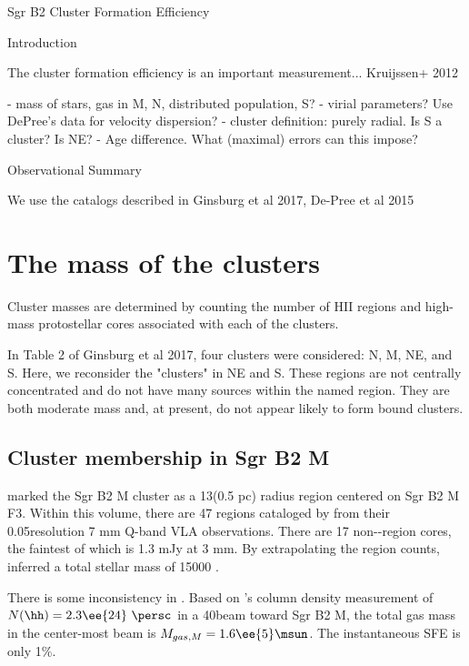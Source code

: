 Sgr B2 Cluster Formation Efficiency

Introduction

The cluster formation efficiency is an important measurement...
Kruijssen+ 2012

- mass of stars, gas in M, N, distributed population, S?
- virial parameters?  Use DePree's data for velocity dispersion?
- cluster definition: purely radial.  Is S a cluster?  Is NE?
- Age difference.  What (maximal) errors can this impose?

Observational Summary

We use the catalogs described in Ginsburg et al 2017, De-Pree et al 2015


\section{The mass of the clusters}
Cluster masses are determined by counting the number of HII regions and high-mass
protostellar cores associated with each of the clusters.

In Table 2 of Ginsburg et al 2017, four clusters were considered: N, M, NE, and
S.  Here, we reconsider the "clusters" in NE and S.  These regions are not
centrally concentrated and do not have many sources within the named region.
They are both moderate mass and, at present, do not appear likely to form bound
clusters.

\subsection{Cluster membership in Sgr B2 M}
\citet{Schmiedeke2016a} marked the Sgr B2 M cluster as a 13\arcsec  (0.5 pc) radius
region centered on Sgr B2 M F3.  Within this volume, there are 47 \hii regions
cataloged by \citet{De-Pree201?} from their 0.05\arcsec resolution 7 mm Q-band
VLA observations.  There are 17 non-\hii-region cores, the faintest of which is
1.3 mJy at 3 mm.  By extrapolating the \hii region counts,
\citet{Ginsburg2017c} inferred a total stellar mass of 15000 \msun.

{\color{red} There is some inconsistency in \citet{Schmiedeke2016a}.}
Based on \citet{Schmiedeke2016a}'s column density measurement of $N(\hh)=2.3\ee{24}~\persc$
in a 40\arcsec beam toward Sgr B2 M, the total gas mass in the center-most beam is
$M_{gas, M} = 1.6\ee{5} \msun$.  The instantaneous SFE is only 1\%.

